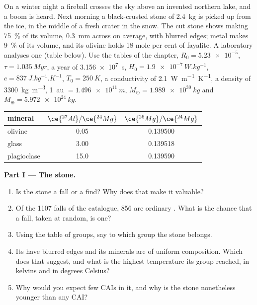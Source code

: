 \begin{problem}
\label{pb:b2:planet-formation-meteorites:1}
On a winter night a fireball crosses the sky above an invented northern lake,
and a boom is heard. Next morning a black-crusted stone of \qty{2.4}{kg} is
picked up from the ice, in the middle of a fresh crater in the snow. The cut
stone shows  making \qty{75}{\percent} of its volume, \qty{0.3}{mm}
across on average, with blurred edges; metal makes \qty{9}{\percent} of its
volume, and its olivine holds 18 mole per cent of fayalite. A laboratory
analyses one  (table below). Use the tables of the chapter,
$R_0 = \num{5.23e-5}$, $\tau = \qty{1.035}{Myr}$, a year of \qty{3.156e7}{s},
$H_0 = \qty{1.9e-7}{W.kg^{-1}}$, $c = \qty{837}{J.kg^{-1}.K^{-1}}$,
$T_0 = \qty{250}{K}$, a conductivity of \qty{2.1}{W.m^{-1}.K^{-1}}, a density of
\qty{3300}{kg.m^{-3}}, \qty{1}{au} $= \qty{1.496e11}{m}$,
$M_\odot = \qty{1.989e30}{kg}$ and $M_\oplus = \qty{5.972e24}{kg}$.

\begin{center}
\small
\begin{tabular}{lcc}
\hline
mineral & $\ce{^{27}Al}/\ce{^{24}Mg}$ & $\ce{^{26}Mg}/\ce{^{24}Mg}$\\
\hline
olivine & 0.05 & \num{0.139500}\\
glass & 3.00 & \num{0.139518}\\
plagioclase & 15.0 & \num{0.139590}\\
\hline
\end{tabular}
\end{center}

\medskip
\noindent\textbf{Part I --- The stone.}
\begin{enumerate}
  \item Is the stone a fall or a find? Why does that make it valuable?
  \item Of the \num{1107} falls of the catalogue, 856 are ordinary . What
        is the chance that a fall, taken at random, is one?
  \item Using the table of  groups, say to which group the stone belongs.
  \item Its  have blurred edges and its minerals are of uniform
        composition. Which  does that suggest, and what is the
        highest temperature its group reached, in kelvins and in degrees Celsius?
  \item Why would you expect few CAIs in it, and why is the stone nonetheless
        younger than any CAI?
\end{enumerate}


\end{problem}
